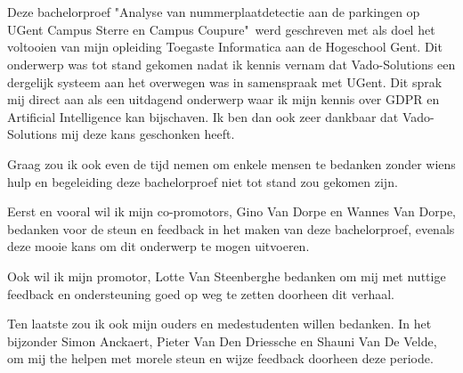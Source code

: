 
\chapter*{}
\label{ch:voorwoord}


Deze bachelorproef "Analyse van nummerplaatdetectie aan de parkingen op UGent Campus Sterre en Campus Coupure"\ werd geschreven met als doel het voltooien van mijn opleiding Toegaste Informatica aan de Hogeschool Gent. Dit onderwerp was tot stand gekomen nadat ik kennis vernam dat Vado-Solutions een dergelijk systeem aan het overwegen was in samenspraak met UGent. Dit sprak mij direct aan als een uitdagend onderwerp waar ik mijn kennis over GDPR en Artificial Intelligence kan bijschaven. Ik ben dan ook zeer dankbaar dat Vado-Solutions mij deze kans geschonken heeft.

Graag zou ik ook even de tijd nemen om enkele mensen te bedanken zonder wiens hulp en begeleiding deze bachelorproef niet tot stand zou gekomen zijn.

Eerst en vooral wil ik mijn co-promotors, Gino Van Dorpe en Wannes Van Dorpe, bedanken voor de steun en feedback in het maken van deze bachelorproef, evenals deze mooie kans om dit onderwerp te mogen uitvoeren.

Ook wil ik mijn promotor, Lotte Van Steenberghe bedanken om mij met nuttige feedback en ondersteuning goed op weg te zetten doorheen dit verhaal.

Ten laatste zou ik ook mijn ouders en medestudenten willen bedanken. In het bijzonder Simon Anckaert, Pieter Van Den Driessche en Shauni Van De Velde, om mij the helpen met morele steun en wijze feedback doorheen deze periode.